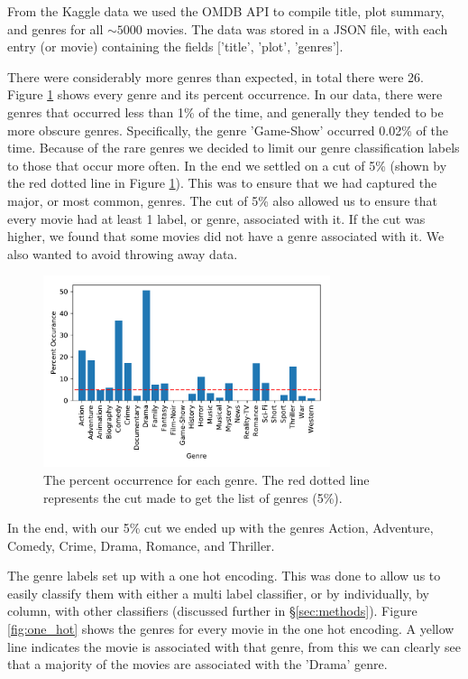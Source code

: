 \documentclass[11pt]{article}
\begin{document}
From the Kaggle data we used the OMDB API to compile title, plot summary, and genres for all $\sim5000$ movies. The data was stored in a JSON file, with each entry (or movie) containing the fields ['title', 'plot', 'genres'].

There were considerably more genres than expected, in total there were 26. Figure \ref{fig:genres} shows every genre and its percent occurrence. In our data, there were genres that occurred less than 1\% of the time, and generally they tended to be more obscure genres. Specifically, the genre 'Game-Show' occurred 0.02\% of the time. Because of the rare genres we decided to limit our genre classification labels to those that occur more often. In the end we settled on a cut of 5\% (shown by the red dotted line in Figure \ref{fig:genres}). This was to ensure that we had captured the major, or most common, genres. The cut of 5\% also allowed us to ensure that every movie had at least 1 label, or genre, associated with it. If the cut was higher, we found that some movies did not have a genre associated with it. We also wanted to avoid throwing away data. 

\begin{figure}[ht]
	\centering
		\includegraphics[width=0.75\textwidth]{genres.pdf}
	\caption{The percent occurrence for each genre. The red dotted line represents the cut made to get the list of genres (5\%).}
	\label{fig:genres}
\end{figure}

In the end, with our 5\% cut we ended up with the genres Action, Adventure, Comedy, Crime, Drama, Romance, and Thriller.

The genre labels set up with a one hot encoding. This was done to allow us to easily classify them with either a multi label classifier, or by individually, by column, with other classifiers (discussed further in \S \ref{sec:methods}). Figure \ref{fig:one_hot} shows the genres for every movie in the one hot encoding. A yellow line indicates the movie is associated with that genre, from this we can clearly see that a majority of the movies are associated with the 'Drama' genre.
\end{document}

